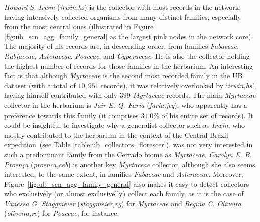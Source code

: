 \textit{Howard S. Irwin} (\textit{irwin,hs}) is the collector with most records in the network, having intensively collected organisms from many distinct families, especially from the most central ones (illustrated in Figure \ref{fig:ub_scn_agg_family_general} as the largest pink nodes in the network core).
The majority of his records are, in descending order, from families \textit{Fabaceae}, \textit{Rubiaceae}, \textit{Asteraceae}, \textit{Poaceae}, and \textit{Cyperaceae}. 
He is also the collector holding the highest number of records for those families in the herbarium.
An interesting fact is that although \textit{Myrtaceae} is the second most recorded family in the UB dataset (with a total of $10,951$ records), it was relatively overlooked by `\textit{irwin,hs}', having himself contributed with only $399$ \textit{Myrtaceae} records. 
The main \textit{Myrtaceae} collector in the herbarium is \textit{Jair E. Q. Faria} (\textit{faria,jeq}), who apparently has a preference towards this family (it comprises $31.0\%$ of his entire set of records). 
It could be insightful to investigate why a generalist collector such as \textit{Irwin}, who mostly contributed to the herbarium in the context of the Central Brazil expedition~(see Table \ref{table:ub_collectors_florescer}), was not very interested in such a predominant family from the Cerrado biome as \textit{Myrtaceae}.
\textit{Carolyn E. B. Proença} (\textit{proenca,ceb}) is another key \textit{Myrtaceae} collector, although she also seems interested, to the same extent, in families \textit{Fabaceae} and \textit{Asteraceae}. 
Moreover, Figure~\ref{fig:ub_scn_agg_family_general} also makes it easy to detect collectors who exclusively (or almost exclusivelly) collect each family, as it is the case of \textit{Vanessa G. Staggmeier} (\textit{staggmeier,vg}) for \textit{Myrtaceae} and \textit{Regina C. Oliveira} (\textit{oliveira,rc}) for \textit{Poaceae}, for instance.

